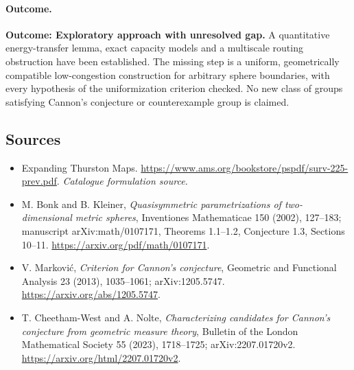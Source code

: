 \documentclass[11pt,a4paper]{article}
\numberwithin{equation}{section}
\begin{document}
\paragraph{Outcome.}
\textbf{Outcome: Exploratory approach with unresolved gap.}
A quantitative energy-transfer lemma, exact capacity models and a multiscale
routing obstruction have been established. The missing step is a uniform,
geometrically compatible low-congestion construction for arbitrary sphere
boundaries, with every hypothesis of the uniformization criterion checked.
No new class of groups satisfying Cannon's conjecture or counterexample
group is claimed.

\subsection{Sources}
\begin{itemize}\raggedright
\item[\textnormal{[S1]}]\hypertarget{source:statement:1}{} Expanding Thurston Maps.
\url{https://www.ams.org/bookstore/pspdf/surv-225-prev.pdf}.
{\small\textit{Catalogue formulation source.}}
\item[\textnormal{[E1]}]\hypertarget{extra:statement:1}{} M. Bonk and B. Kleiner,
\emph{Quasisymmetric parametrizations of two-dimensional metric spheres},
Inventiones Mathematicae 150 (2002), 127--183; manuscript
arXiv:math/0107171, Theorems 1.1--1.2, Conjecture 1.3, Sections 10--11.
\url{https://arxiv.org/pdf/math/0107171}.
\item[\textnormal{[E2]}]\hypertarget{extra:statement:2}{} V. Markovi\'c,
\emph{Criterion for Cannon's conjecture}, Geometric and Functional Analysis
23 (2013), 1035--1061; arXiv:1205.5747.
\url{https://arxiv.org/abs/1205.5747}.
\item[\textnormal{[E3]}]\hypertarget{extra:statement:3}{} T. Cheetham-West and A. Nolte,
\emph{Characterizing candidates for Cannon's conjecture from geometric
measure theory}, Bulletin of the London Mathematical Society 55 (2023),
1718--1725; arXiv:2207.01720v2.
\url{https://arxiv.org/html/2207.01720v2}.

\end{itemize}
\end{document}
